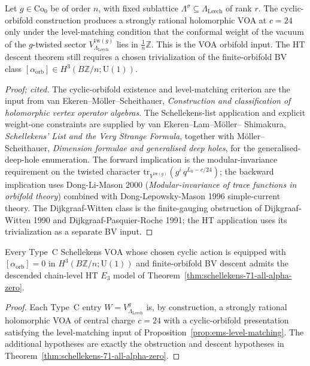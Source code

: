 \begin{proposition}
\label{prop:ems-level-matching}
Let $g \in \mathrm{Co}_0$ be of order $n$, with fixed sublattice
$\Lambda^\sigma \subseteq \Lambda_{\mathrm{Leech}}$ of rank $r$. The
cyclic-orbifold construction produces a strongly rational holomorphic
VOA at $c = 24$ only under the level-matching condition that the
conformal weight of the vacuum of the $g$-twisted sector
$V_{\Lambda_{\mathrm{Leech}}}^{\mathrm{tw}(g)}$ lies in
$\frac{1}{n}\mathbb{Z}$. This is the VOA orbifold input. The HT
descent theorem still requires a chosen trivialization of the
finite-orbifold BV class
$[\alpha_{\mathrm{orb}}]\in H^3(B\mathbb{Z}/n; \mathrm{U}(1))$.
\end{proposition}

\begin{proof}[Proof; cited]
The cyclic-orbifold existence and level-matching criterion are the
input from van Ekeren--M\"oller--Scheithauer,
\emph{Construction and classification of holomorphic vertex operator
algebras}. The Schellekens-list application and explicit
weight-one constraints are supplied by van Ekeren--Lam--M\"oller--
Shimakura, \emph{Schellekens' List and the Very Strange Formula},
together with M\"oller--Scheithauer,
\emph{Dimension formulae and generalised deep holes}, for the
generalised-deep-hole enumeration. The forward implication is the
modular-invariance requirement on the twisted character
$\mathrm{tr}_{V^{\mathrm{tw}(g)}}(g^i\, q^{L_0 - c/24})$; the
backward implication uses Dong-Li-Mason 2000
(\emph{Modular-invariance of trace functions in orbifold theory})
combined with Dong-Lepowsky-Mason 1996 simple-current theory. The
Dijkgraaf-Witten class is the finite-gauging obstruction of
Dijkgraaf-Witten 1990 and Dijkgraaf-Pasquier-Roche 1991; the HT
application uses its trivialization as a separate BV input.
\end{proof}

\begin{corollary}
\label{cor:schellekens-typeC-alpha-zero}
Every Type~C Schellekens VOA whose chosen cyclic action is equipped
with $[\alpha_{\mathrm{orb}}]=0$ in
$H^3(B\mathbb{Z}/n; \mathrm{U}(1))$ and finite-orbifold BV descent
admits the descended chain-level HT $E_3$ model of
Theorem~\ref{thm:schellekens-71-all-alpha-zero}.
\end{corollary}

\begin{proof}
Each Type~C entry $W = V_{\Lambda_{\mathrm{Leech}}}^g$ is, by
construction, a strongly rational holomorphic VOA of central charge
$c = 24$ with a cyclic-orbifold presentation satisfying the
level-matching input of Proposition~\ref{prop:ems-level-matching}. The
additional hypotheses are exactly the obstruction and descent
hypotheses in Theorem~\ref{thm:schellekens-71-all-alpha-zero}.
\end{proof}

